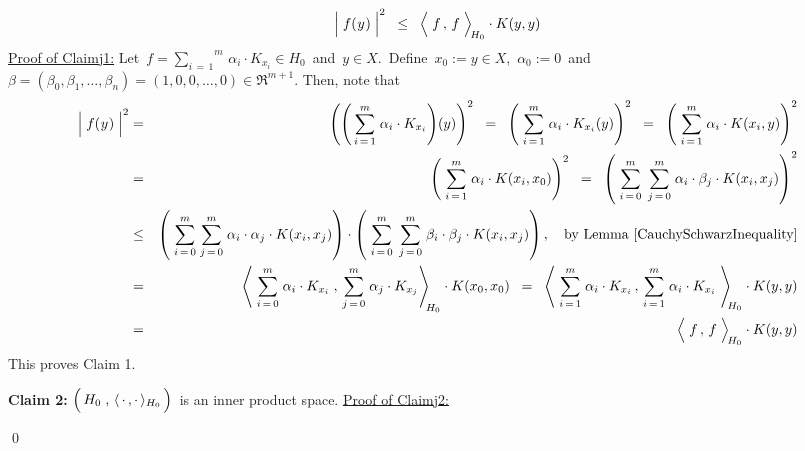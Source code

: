 \begin{equation*}
\left\vert\;f(\overset{{\color{white}-}}{y})\;\right\vert^{2}
\;\; \leq \;\;
	\left\langle\; \overset{{\color{white}.}}{f} \,,\, f \;\right\rangle_{\!H_{0}}
	\cdot
	K(y,y)
\end{equation*}
\underline{Proof of Claim{\color{white}j}1:}\quad
Let
\,$f = \overset{m}{\underset{i\,=\,1}{\sum}}\, \alpha_{i} \cdot K_{x_{i}} \in H_{0}$\,
and
\,$y \in X$.\,
Define \,$x_{0} := y \in X$,\, $\alpha_{0} := 0$\, and
\,$\beta = (\beta_{0},\beta_{1},\ldots,\beta_{n}) = (1,0,0,\ldots,0) \in \Re^{m+1}$.
Then, note that
\begin{eqnarray*}
\left\vert\;f(\overset{{\color{white}-}}{y})\;\right\vert^{2}
& = &
	\left(
		\left(\,\overset{m}{\underset{i\,=\,1}{\sum}}\; \alpha_{i} \cdot K_{x_{i}}\right)\!(y)
		\right)^{2}
\;\; = \;\;
	\left(\;
		\overset{m}{\underset{i\,=\,1}{\sum}}\; \alpha_{i} \cdot K_{x_{i}}(y)
		\right)^{2}
\;\; = \;\;
	\left(\;
		\overset{m}{\underset{i\,=\,1}{\sum}}\; \alpha_{i} \cdot K(x_{i},y)
		\right)^{2}
\\
& = &
	\left(\;
		\overset{m}{\underset{i\,=\,1}{\sum}}\; \alpha_{i} \cdot K(x_{i},x_{0})
		\right)^{2}
\;\; = \;\;
	\left(\;
		\overset{m}{\underset{i\,=\,0}{\sum}}\;\,
		\overset{m}{\underset{j\,=\,0}{\sum}}\;
		\alpha_{i} \cdot \beta_{j} \cdot K(x_{i},x_{j})
		\right)^{2}
\\
& \leq &
	\left(\;
		\overset{m}{\underset{i\,=\,0}{\sum}}\;
		\overset{m}{\underset{j\,=\,0}{\sum}}\;
		\alpha_{i} \cdot \alpha_{j} \cdot K(x_{i},x_{j})
		\right)
	\cdot
	\left(\;
		\overset{m}{\underset{i\,=\,0}{\sum}}\;\,
		\overset{m}{\underset{j\,=\,0}{\sum}}\;
		\beta_{i} \cdot \beta_{j} \cdot K(x_{i},x_{j})
		\right),
	\quad
	\textnormal{by Lemma \ref{CauchySchwarzInequality}}
\\
& = &
	\left\langle\;
		\overset{m}{\underset{i\,=\,0}{\sum}}\; \alpha_{i} \cdot K_{x_{i}}
		\;,\,
		\overset{m}{\underset{j\,=\,0}{\sum}}\; \alpha_{j} \cdot K_{x_{j}}
		\right\rangle_{\!\!H_{0}}
	\cdot
	K(x_{0},x_{0})
\;\; = \;\;
	\left\langle\;
		\overset{m}{\underset{i\,=\,1}{\sum}}\; \alpha_{i} \cdot K_{x_{i}}
		\,,\,
		\overset{m}{\underset{i\,=\,1}{\sum}}\; \alpha_{i} \cdot K_{x_{i}}
		\;\right\rangle_{\!\!H_{0}}
	\cdot
	K(y,y)
\\
& = &
	\left\langle\; \overset{{\color{white}.}}{f} \,,\, f \;\right\rangle_{\!H_{0}}
	\cdot
	K(y,y)
\end{eqnarray*}
This proves Claim 1.

\vskip 0.5cm
\noindent
\textbf{Claim 2:}\quad
$\left(\,\overset{{\color{white}.}}{H_{0}}\;,\,\langle\,\cdot\,,\cdot\,\rangle_{H_{0}}\,\right)$\,
is an inner product space.
\vskip 0.2cm
\noindent
\underline{Proof of Claim{\color{white}j}2:}\quad

\qed


\renewcommand{\theenumi}{\roman{enumi}}
\renewcommand{\labelenumi}{\textnormal{(\theenumi)}$\;\;$}

